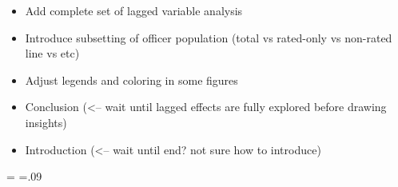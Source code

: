 \documentclass[12pt,letterpaper,toc=flat,oneside]{report}
\providecommand{\tightlist}{%
\setlength{\itemsep}{0pt}\setlength{\parskip}{0pt}}
\theoremstyle{definition}
\theoremstyle{definition}
\theoremstyle{definition}
\theoremstyle{remark}
\begin{document}
\begin{itemize}
\tightlist
\item
  Add complete set of lagged variable analysis
\item
  Introduce subsetting of officer population (total vs rated-only vs
  non-rated line vs etc)
\item
  Adjust legends and coloring in some figures
\item
  Conclusion (\textless{}-- wait until lagged effects are fully explored
  before drawing insights)
\item
  Introduction (\textless{}-- wait until end? not sure how to introduce)
\end{itemize}
\newpage
\singlespace

\pagestyle{empty}
\singlespace
{} 
\newdimen\rhI       {}\textheight
\newdimen\rhII      {}\textheight
\newdimen\rhIII     {}\textheight
\newdimen\rhIV      {}\textheight
\newdimen\rhV       \rhV=\rhIV
\newdimen\rhVI      \rhVI=.09\textheight
\newdimen\rhVII     {}\textheight
\newdimen\rhVIII    {}\textheight
\newdimen\rhIX      {}\textheight
\newdimen\rhX       {}\textheight
\newdimen\rhXI      {}\textheight
\newdimen\rhXII     {}\textheight
\end{document}
